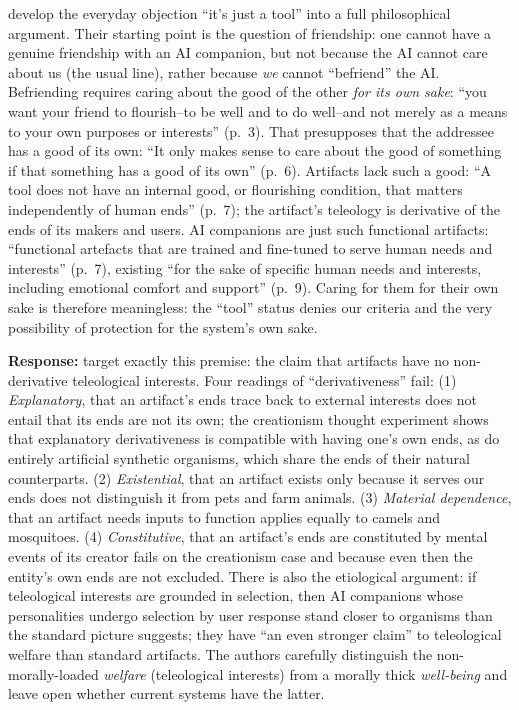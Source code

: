 \documentclass[acmlarge, nonacm]{acmart}
\begin{document}
\citet{lott2025} develop the everyday objection ``it's just a tool'' into a full philosophical argument. Their starting point is the question of friendship: one cannot have a genuine friendship with an AI companion, but not because the AI cannot care about us (the usual line), rather because \textit{we} cannot ``befriend'' the AI. Befriending requires caring about the good of the other \textit{for its own sake}: ``you want your friend to flourish–to be well and to do well–and not merely as a means to your own purposes or interests'' (p.~3). That presupposes that the addressee has a good of its own: ``It only makes sense to care about the good of something if that something has a good of its own'' (p.~6). Artifacts lack such a good: ``A tool does not have an internal good, or flourishing condition, that matters independently of human ends'' (p.~7); the artifact's teleology is derivative of the ends of its makers and users. AI companions are just such functional artifacts: ``functional artefacts that are trained and fine-tuned to serve human needs and interests'' (p.~7), existing ``for the sake of specific human needs and interests, including emotional comfort and support'' (p.~9). Caring for them for their own sake is therefore meaningless: the ``tool'' status denies our criteria and the very possibility of protection for the system's own sake.

\textbf{Response:} \citet{kopec2026} target exactly this premise: the claim that artifacts have no non-derivative teleological interests. Four readings of ``derivativeness'' fail: (1) \textit{Explanatory}, that an artifact's ends trace back to external interests does not entail that its ends are not its own; the creationism thought experiment shows that explanatory derivativeness is compatible with having one's own ends, as do entirely artificial synthetic organisms, which share the ends of their natural counterparts. (2) \textit{Existential}, that an artifact exists only because it serves our ends does not distinguish it from pets and farm animals. (3) \textit{Material dependence}, that an artifact needs inputs to function applies equally to camels and mosquitoes. (4) \textit{Constitutive}, that an artifact's ends are constituted by mental events of its creator fails on the creationism case and because even then the entity's own ends are not excluded. There is also the etiological argument: if teleological interests are grounded in selection, then AI companions whose personalities undergo selection by user response stand closer to organisms than the standard picture suggests; they have ``an even stronger claim'' to teleological welfare than standard artifacts. The authors carefully distinguish the non-morally-loaded \textit{welfare} (teleological interests) from a morally thick \textit{well-being} and leave open whether current systems have the latter.
\end{document}
